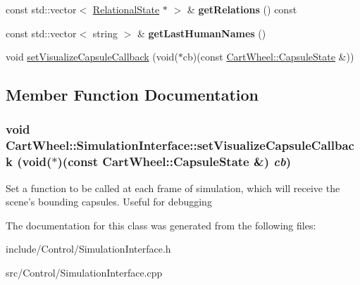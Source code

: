 \begin{DoxyCompactItemize}
\item 
\hypertarget{classCartWheel_1_1SimulationInterface_a731bfb656fe6215318e0687dda196bd1}{
const std::vector$<$ \hyperlink{classCartWheel_1_1RelationalState}{RelationalState} $\ast$ $>$ \& {\bfseries getRelations} () const }
\label{classCartWheel_1_1SimulationInterface_a731bfb656fe6215318e0687dda196bd1}

\item 
\hypertarget{classCartWheel_1_1SimulationInterface_ac84e5aa20dc4d4581f5f5ee0215d3450}{
const std::vector$<$ string $>$ \& {\bfseries getLastHumanNames} ()}
\label{classCartWheel_1_1SimulationInterface_ac84e5aa20dc4d4581f5f5ee0215d3450}

\item 
void \hyperlink{classCartWheel_1_1SimulationInterface_a44b351734692fe47f86b88a4143f7aeb}{setVisualizeCapsuleCallback} (void($\ast$cb)(const \hyperlink{classCartWheel_1_1CapsuleState}{CartWheel::CapsuleState} \&))
\end{DoxyCompactItemize}


\subsection{Member Function Documentation}
\hypertarget{classCartWheel_1_1SimulationInterface_a44b351734692fe47f86b88a4143f7aeb}{
\subsubsection[{setVisualizeCapsuleCallback}]{\setlength{\rightskip}{0pt plus 5cm}void CartWheel::SimulationInterface::setVisualizeCapsuleCallback (void($\ast$)(const {\bf CartWheel::CapsuleState} \&) {\em cb})}}
\label{classCartWheel_1_1SimulationInterface_a44b351734692fe47f86b88a4143f7aeb}
Set a function to be called at each frame of simulation, which will receive the scene's bounding capsules. Useful for debugging 

The documentation for this class was generated from the following files:\begin{DoxyCompactItemize}
\item 
include/Control/SimulationInterface.h\item 
src/Control/SimulationInterface.cpp\end{DoxyCompactItemize}
